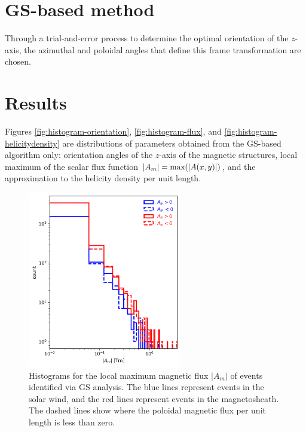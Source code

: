\section{GS-based method}
Through a trial-and-error process to determine the optimal orientation of the $z$-axis, the azimuthal and poloidal angles that define this frame transformation are chosen.

\section{Results}
Figures \ref{fig:histogram-orientation}, \ref{fig:histogram-flux}, and \ref{fig:histogram-helicitydensity} are distributions of parameters obtained from the GS-based algorithm only: orientation angles of the $z$-axis of the magnetic structures, local maximum of the scalar flux function $|A_m| = \textnormal{max}(|A(x,y)|)$, and the approximation to the helicity density per unit length.

\begin{figure}
    \centering
    \includegraphics[width=0.6\textwidth]{Figures/Histograms/histogram_Asplit.png}
    \caption{Histograms for the local maximum magnetic flux $|A_m|$ of events identified via GS analysis. The blue lines represent events in the solar wind, and the red lines represent events in the magnetosheath. The dashed lines show where the poloidal magnetic flux per unit length is less than zero.}
    \label{fig:histogram-Asplit}
\end{figure}



